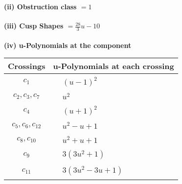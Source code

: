 \documentclass[1p]{elsarticle_modified}
\theoremstyle{definition}
\begin{document}
\flushleft \textbf{(ii) Obstruction class $= 1$}\\~\\
\flushleft \textbf{(iii) Cusp Shapes $= \frac{28}{3} u-10$}\\~\\
\newpage\renewcommand{\arraystretch}{1}
\flushleft \textbf{(iv) u-Polynomials at the component}\newline \\
\begin{tabular}{m{50pt}|m{274pt}}
Crossings & \hspace{64pt}u-Polynomials at each crossing \\
\hline $$\begin{aligned}c_{1}\end{aligned}$$&$\begin{aligned}
&(u-1)^2
\end{aligned}$\\
\hline $$\begin{aligned}c_{2},c_{3},c_{7}\end{aligned}$$&$\begin{aligned}
&u^2
\end{aligned}$\\
\hline $$\begin{aligned}c_{4}\end{aligned}$$&$\begin{aligned}
&(u+1)^2
\end{aligned}$\\
\hline $$\begin{aligned}c_{5},c_{6},c_{12}\end{aligned}$$&$\begin{aligned}
&u^2- u+1
\end{aligned}$\\
\hline $$\begin{aligned}c_{8},c_{10}\end{aligned}$$&$\begin{aligned}
&u^2+u+1
\end{aligned}$\\
\hline $$\begin{aligned}c_{9}\end{aligned}$$&$\begin{aligned}
&3(3 u^2+1)
\end{aligned}$\\
\hline $$\begin{aligned}c_{11}\end{aligned}$$&$\begin{aligned}
&3(3 u^2-3 u+1)
\end{aligned}$\\
\hline
\end{tabular}\\~\\
\end{document}
